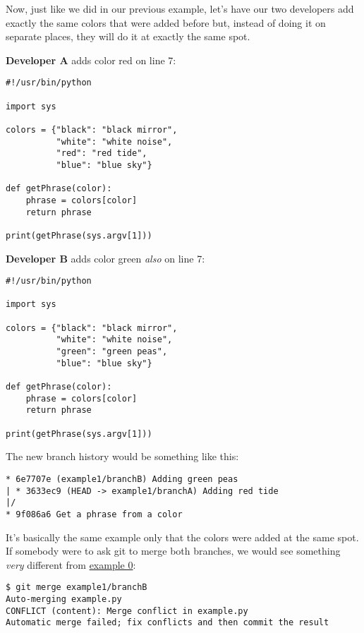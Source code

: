 Now, just like we did in our previous example, let's have our two developers add exactly the same colors that were added
before but, instead of doing it on separate places, they will do it at exactly the same spot.

{\bf Developer A} adds color red on line 7:
\begin{lstlisting}[style=python_style, caption={\bf example 1} - Developer A]
#!/usr/bin/python

import sys

colors = {"black": "black mirror",
          "white": "white noise",
          "red": "red tide",
          "blue": "blue sky"}

def getPhrase(color):
    phrase = colors[color]
    return phrase

print(getPhrase(sys.argv[1]))
\end{lstlisting}

{\bf Developer B} adds color green {\it also} on line 7:
\begin{lstlisting}[style=python_style, caption={\bf example 1} - Developer B]
#!/usr/bin/python

import sys

colors = {"black": "black mirror",
          "white": "white noise",
          "green": "green peas",
          "blue": "blue sky"}

def getPhrase(color):
    phrase = colors[color]
    return phrase

print(getPhrase(sys.argv[1]))
\end{lstlisting}

The new branch history would be something like this:
\begin{lstlisting}[style=branch_history_style, caption={\bf Example 1} - branch history]
* 6e7707e (example1/branchB) Adding green peas
| * 3633ec9 (HEAD -> example1/branchA) Adding red tide
|/  
* 9f086a6 Get a phrase from a color
\end{lstlisting}

It's basically the same example only that the colors were added at the same spot. If somebody were to ask git to merge both
branches, we would see something {\it very} different from \hyperref[example_00]{example 0}:

\begin{lstlisting}[style=console_style, caption={\bf Example 1} - git merge output]
$ git merge example1/branchB
Auto-merging example.py
CONFLICT (content): Merge conflict in example.py
Automatic merge failed; fix conflicts and then commit the result
\end{lstlisting}

